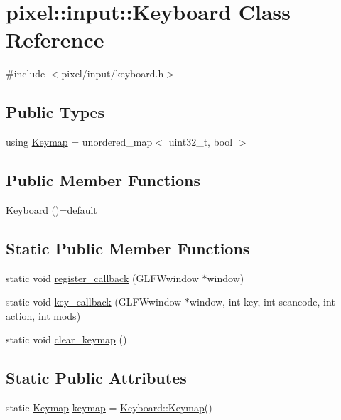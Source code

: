 \hypertarget{classpixel_1_1input_1_1_keyboard}{}\section{pixel\+:\+:input\+:\+:Keyboard Class Reference}
\label{classpixel_1_1input_1_1_keyboard}


{\ttfamily \#include $<$pixel/input/keyboard.\+h$>$}

\subsection*{Public Types}
\begin{DoxyCompactItemize}
\item 
using \hyperlink{classpixel_1_1input_1_1_keyboard_a9c2e61fefeba656cf2eb1adfccacc58a}{Keymap} = unordered\+\_\+map$<$ uint32\+\_\+t, bool $>$
\end{DoxyCompactItemize}
\subsection*{Public Member Functions}
\begin{DoxyCompactItemize}
\item 
\hyperlink{classpixel_1_1input_1_1_keyboard_a2604776e54e7511a26d0b1c7e03c44e2}{Keyboard} ()=default
\end{DoxyCompactItemize}
\subsection*{Static Public Member Functions}
\begin{DoxyCompactItemize}
\item 
static void \hyperlink{classpixel_1_1input_1_1_keyboard_abb0164a3125839568abc8447ac671a87}{register\+\_\+callback} (G\+L\+F\+Wwindow $\ast$window)
\item 
static void \hyperlink{classpixel_1_1input_1_1_keyboard_a56a80cab312b6241d368e77f07f1b126}{key\+\_\+callback} (G\+L\+F\+Wwindow $\ast$window, int key, int scancode, int action, int mods)
\item 
static void \hyperlink{classpixel_1_1input_1_1_keyboard_a5c220f10381043f8c784ce69f4ae6015}{clear\+\_\+keymap} ()
\end{DoxyCompactItemize}
\subsection*{Static Public Attributes}
\begin{DoxyCompactItemize}
\item 
static \hyperlink{classpixel_1_1input_1_1_keyboard_a9c2e61fefeba656cf2eb1adfccacc58a}{Keymap} \hyperlink{classpixel_1_1input_1_1_keyboard_ac0044c74f811cec7f45dd36038982725}{keymap} = \hyperlink{classpixel_1_1input_1_1_keyboard_a9c2e61fefeba656cf2eb1adfccacc58a}{Keyboard\+::\+Keymap}()
\end{DoxyCompactItemize}


